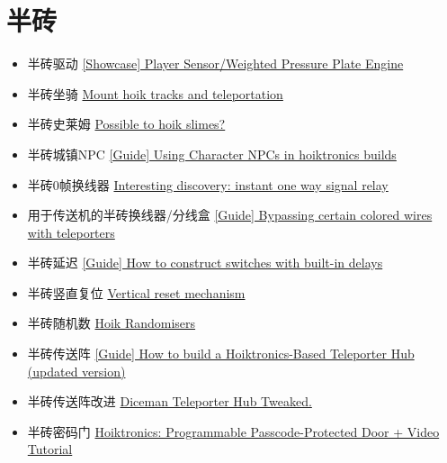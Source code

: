 \section{半砖}
\begin{itemize}
\item 半砖驱动 \href{https://forums.terraria.org/index.php?threads/showcase-player-sensor-weighted-pressure-plate-engine.76597/}{[Showcase] Player Sensor/Weighted Pressure Plate Engine}
\item 半砖坐骑 \href{https://forums.terraria.org/index.php?threads/mount-hoik-tracks-and-teleportation.76953/}{Mount hoik tracks and teleportation}
\item 半砖史莱姆 \href{https://forums.terraria.org/index.php?threads/possible-to-hoik-slimes.75820/}{Possible to hoik slimes?}
\item 半砖城镇NPC \href{https://forums.terraria.org/index.php?threads/guide-using-character-npcs-in-hoiktronics-builds.75934/}{[Guide] Using Character NPCs in hoiktronics builds}
\item 半砖0帧换线器 \href{https://forums.terraria.org/index.php?threads/interesting-discovery-instant-one-way-signal-relay.77012/}{Interesting discovery: instant one way signal relay}
\item 用于传送机的半砖换线器/分线盒 \href{https://forums.terraria.org/index.php?threads/guide-bypassing-certain-colored-wires-with-teleporters.75929/}{[Guide] Bypassing certain colored wires with teleporters}
\item 半砖延迟 \href{https://forums.terraria.org/index.php?threads/guide-how-to-construct-switches-with-built-in-delays.75931/}{[Guide] How to construct switches with built-in delays}
\item 半砖竖直复位 \href{https://forums.terraria.org/index.php?threads/vertical-reset-mechanism.77035/}{Vertical reset mechanism}
\item 半砖随机数 \href{https://forums.terraria.org/index.php?threads/hoik-randomisers.77040/}{Hoik Randomisers}
\item 半砖传送阵 \href{https://forums.terraria.org/index.php?threads/guide-how-to-build-a-hoiktronics-based-teleporter-hub-updated-version.75867/}{[Guide] How to build a Hoiktronics-Based Teleporter Hub (updated version)}
\item 半砖传送阵改进 \href{https://forums.terraria.org/index.php?threads/diceman-teleporter-hub-tweaked.75979/}{Diceman Teleporter Hub Tweaked.}
\item 半砖密码门 \href{https://forums.terraria.org/index.php?threads/hoiktronics-programmable-passcode-protected-door-video-tutorial.12232/}{Hoiktronics: Programmable Passcode-Protected Door + Video Tutorial}

\end{itemize}
